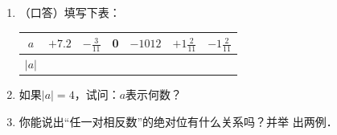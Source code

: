 \begin{ex}
\begin{enumerate}
    \item （口答）填写下表：
    \begin{center}
        \renewcommand{\arraystretch}{1.8}
\begin{tabular}{c|cccccc}
    \hline
$a$ & $+7.2$ & $-\frac{3}{11}$ & 0& $-1012$ &$+1\frac{2}{11}$ &$-1\frac{2}{11}$\\
   \hline
$|a|$\\
    \hline
\end{tabular}       
    \end{center}
\item 如果$|a|=4$，试问：$a$表示何数？
\item 你能说出“任一对相反数”的绝对位有什么关系吗？并举
  出两例．
\end{enumerate}
\end{ex}

